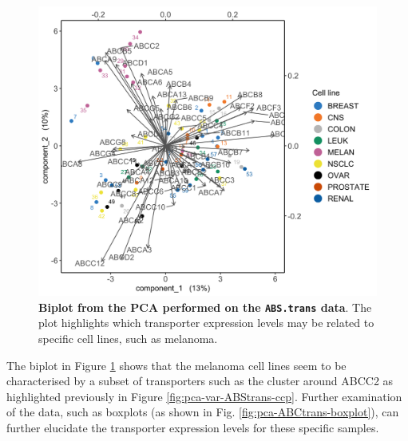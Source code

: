 \documentclass[]{book}
\newenvironment{Shaded}{\begin{snugshade}}{\end{snugshade}}
\newcommand{\CommentTok}[1]{\textcolor[rgb]{0.56,0.35,0.01}{\textit{#1}}}
\newcommand{\DataTypeTok}[1]{\textcolor[rgb]{0.13,0.29,0.53}{#1}}
\newcommand{\DecValTok}[1]{\textcolor[rgb]{0.00,0.00,0.81}{#1}}
\newcommand{\FloatTok}[1]{\textcolor[rgb]{0.00,0.00,0.81}{#1}}
\newcommand{\KeywordTok}[1]{\textcolor[rgb]{0.13,0.29,0.53}{\textbf{#1}}}
\newcommand{\NormalTok}[1]{#1}
\newcommand{\OperatorTok}[1]{\textcolor[rgb]{0.81,0.36,0.00}{\textbf{#1}}}
\newcommand{\OtherTok}[1]{\textcolor[rgb]{0.56,0.35,0.01}{#1}}
\newcommand{\StringTok}[1]{\textcolor[rgb]{0.31,0.60,0.02}{#1}}
\begin{document}
\begin{Shaded}
\end{Shaded}

\begin{figure}

{\centering \includegraphics[width=0.5\linewidth]{Figures/PCA/pca-ABStrans-biplot-1} 

}

\caption{\textbf{Biplot from the PCA performed on the \texttt{ABS.trans} data}. The plot highlights which transporter expression levels may be related to specific cell lines, such as melanoma.}\label{fig:pca-ABStrans-biplot}
\end{figure}



The biplot in Figure \ref{fig:pca-ABStrans-biplot} shows that the melanoma cell lines seem to be characterised by a subset of transporters such as the cluster around ABCC2 as highlighted previously in Figure \ref{fig:pca-var-ABStrans-ccp}. Further examination of the data, such as boxplots (as shown in Fig. \ref{fig:pca-ABCtrans-boxplot}), can further elucidate the transporter expression levels for these specific samples.

\begin{Shaded}
\end{Shaded}
\end{document}
